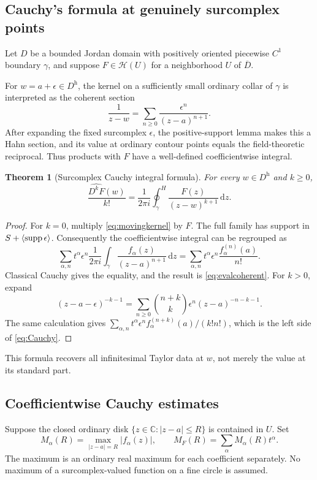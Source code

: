 \documentclass[11pt,a4paper]{article}
\newtheorem{theorem}{Theorem}[section]
\theoremstyle{definition}\newtheorem{definition}[theorem]{Definition}
\theoremstyle{remark}\newtheorem{remark}[theorem]{Remark}
\newcommand{\C}{\mathbb C}\newcommand{\R}{\mathbb R}\newcommand{\N}{\mathbb N}\newcommand{\Z}{\mathbb Z}
\newcommand{\A}{\mathscr H}\newcommand{\hol}{\mathcal O}
\newcommand{\ev}[1]{\widehat{#1}}
\newcommand{\hoint}{\mathop{\oint}\nolimits^{\!H}}
\newcommand{\halo}[1]{#1^{\mathrm h}}
\newcommand{\dd}{\,\mathrm d}
\numberwithin{equation}{section}
\begin{document}
\subsection{Cauchy's formula at genuinely surcomplex points}
Let $D$ be a bounded Jordan domain with positively oriented piecewise $C^1$ boundary $\gamma$, and suppose $F\in\A(U)$ for a neighborhood $U$ of $\overline D$.

For $w=a+\epsilon\in\halo D$, the kernel on a sufficiently small ordinary collar of $\gamma$ is interpreted as the coherent section
\begin{equation}\label{eq:movingkernel}
 \frac1{z-w}=\sum_{n\geq0}\frac{\epsilon^n}{(z-a)^{n+1}}.
\end{equation}
After expanding the fixed surcomplex $\epsilon$, the positive-support lemma makes this a Hahn section, and its value at ordinary contour points equals the field-theoretic reciprocal. Thus products with $F$ have a well-defined coefficientwise integral.

\begin{theorem}[Surcomplex Cauchy integral formula]\label{thm:Cauchy}
For every $w\in\halo D$ and $k\geq0$,
\begin{equation}\label{eq:Cauchy}
 \boxed{\quad
 \frac{\ev{D^kF}(w)}{k!}
 =\frac1{2\pi i}\hoint_\gamma
       \frac{F(z)}{(z-w)^{k+1}}\dd z.
 \quad}
\end{equation}
\end{theorem}
\begin{proof}
For $k=0$, multiply \eqref{eq:movingkernel} by $F$. The full family has support in $S+\langle\operatorname{supp}\epsilon\rangle$. Consequently the coefficientwise integral can be regrouped as
\[
 \sum_{\alpha,n}t^\alpha\epsilon^n
   \frac1{2\pi i}\int_\gamma
        \frac{f_\alpha(z)}{(z-a)^{n+1}}\dd z
 =\sum_{\alpha,n}t^\alpha\epsilon^n
        \frac{f_\alpha^{(n)}(a)}{n!}.
\]
Classical Cauchy gives the equality, and the result is \eqref{eq:evalcoherent}. For $k>0$, expand
\[
 (z-a-\epsilon)^{-k-1}
 =\sum_{n\geq0}\binom{n+k}{k}
   \epsilon^n(z-a)^{-n-k-1}.
\]
The same calculation gives
$\sum_{\alpha,n}t^\alpha\epsilon^n f_\alpha^{(n+k)}(a)/(k!n!)$,
which is the left side of \eqref{eq:Cauchy}.
\end{proof}
This formula recovers all infinitesimal Taylor data at $w$, not merely the value at its standard part.

\subsection{Coefficientwise Cauchy estimates}
Suppose the closed ordinary disk $\{z\in\C:|z-a|\leq R\}$ is contained in $U$. Set
\[
 M_\alpha(R)=\max_{|z-a|=R}|f_\alpha(z)|,
 \qquad M_F(R)=\sum_\alpha M_\alpha(R)t^\alpha.
\]
The maximum is an ordinary real maximum for each coefficient separately. No maximum of a surcomplex-valued function on a fine circle is assumed.
\end{document}
